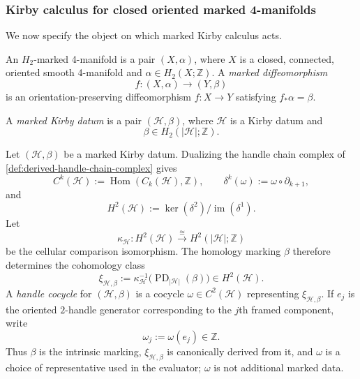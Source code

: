 \subsubsection{Kirby calculus for closed oriented marked 4-manifolds}
\label{subsec:marked-kirby-calculus}

We now specify the object on which marked Kirby calculus acts.

\begin{definition}
\label{def:marked-four-manifold}
An \(H_2\)-marked 4-manifold is a pair \((X,\alpha)\), where \(X\) is a
closed, connected, oriented smooth 4-manifold and
\(\alpha\in H_2(X;\mathbb Z)\).
A \emph{marked diffeomorphism}
\[
  f\colon(X,\alpha)\longrightarrow(Y,\beta)
\]
is an orientation-preserving diffeomorphism \(f\colon X\to Y\) satisfying
\(f_*\alpha=\beta\).
\end{definition}

\begin{definition}
\label{def:handle-homology-marking}
A \emph{marked Kirby datum} is a pair \((\mathcal H,\beta)\), where
\(\mathcal H\) is a Kirby datum and
\[
  \beta\in H_2(|\mathcal H|;\mathbb Z).
\]
\end{definition}

\begin{definition}
\label{def:handle-cocycle}
Let \((\mathcal H,\beta)\) be a marked Kirby datum.  Dualizing the handle
chain complex of \cref{def:derived-handle-chain-complex} gives
\[
  C^k(\mathcal H):=\operatorname{Hom}(C_k(\mathcal H),\mathbb Z),
  \qquad
  \delta^k(\omega):=\omega\circ\partial_{k+1},
\]
and
\[
  H^2(\mathcal H):=
  \ker(\delta^2)/\operatorname{im}(\delta^1).
\]
Let
\[
  \kappa_{\mathcal H}\colon
  H^2(\mathcal H)\xrightarrow{\ \cong\ }
  H^2(|\mathcal H|;\mathbb Z)
\]
be the cellular comparison isomorphism.  The homology marking \(\beta\)
therefore determines the cohomology class
\[
  \xi_{\mathcal H,\beta}
  :=\kappa_{\mathcal H}^{-1}
    \bigl(\operatorname{PD}_{|\mathcal H|}(\beta)\bigr)
  \in H^2(\mathcal H).
\]
A \emph{handle cocycle} for \((\mathcal H,\beta)\) is a cocycle
\(\omega\in C^2(\mathcal H)\) representing
\(\xi_{\mathcal H,\beta}\).  If \(e_j\) is the oriented \(2\)-handle
generator corresponding to the \(j\)th framed component, write
\[
  \omega_j:=\omega(e_j)\in\mathbb Z.
\]
Thus \(\beta\) is the intrinsic marking, \(\xi_{\mathcal H,\beta}\) is
canonically derived from it, and \(\omega\) is a choice of representative
used in the evaluator; \(\omega\) is not additional marked data.
\end{definition}

